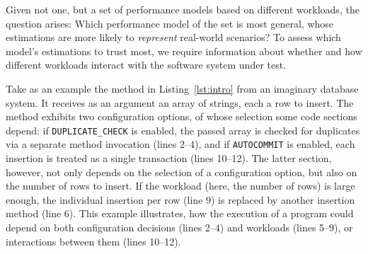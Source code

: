 {
\color{green}
Given not one, but a set of performance models based on different workloads, the question arises: Which performance model of the set is most general, whose estimations are more likely to \emph{represent} real-world scenarios? 
To assess which model's estimations to trust most, we require information about whether and how different workloads interact with the software system under test. 
}

{\color{red}
Take as an example the method in Listing~\ref{lst:intro} from an imaginary database system. It receives as an argument an array of strings, each a row to insert. The method exhibits two configuration options, of whose selection some code sections depend: if \texttt{DUPLICATE\_CHECK} is enabled, the passed array is checked for duplicates via a separate method invocation (lines 2--4), and if \texttt{AUTOCOMMIT} is enabled, each insertion is treated as a single transaction (lines 10--12). The latter section, however, not only depends on the selection of a configuration option, but also on the number of rows to insert. If the workload (here, the number of rows) is large enough, the individual insertion per row (line 9) is replaced by another insertion method (line 6). This example illustrates, how the execution of a program could depend on both configuration decisions (lines 2--4) and workloads (lines 5--9), or interactions between them (lines 10--12).

\begin{figure}
\begin{subfigure}[l]{0.63\linewidth}
	



\end{subfigure}
\end{figure}}
